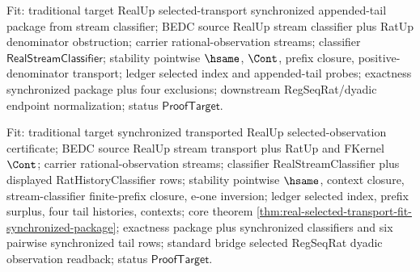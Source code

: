 Fit: traditional target RealUp selected-transport synchronized appended-tail package from stream classifier; BEDC source RealUp stream classifier plus RatUp
denominator obstruction; carrier rational-observation streams; classifier $\mathsf{RealStreamClassifier}$; stability pointwise $\hsame$, $\Cont$, prefix
closure, positive-denominator transport; ledger selected index and appended-tail probes; exactness synchronized package plus four exclusions; downstream
RegSeqRat/dyadic endpoint normalization; status $\mathsf{ProofTarget}$.

Fit: traditional target synchronized transported RealUp selected-observation
certificate; BEDC source RealUp stream transport plus RatUp and FKernel
$\Cont$; carrier rational-observation streams; classifier RealStreamClassifier
plus displayed RatHistoryClassifier rows; stability pointwise $\hsame$, context
closure, stream-classifier finite-prefix closure, e-one inversion; ledger
selected index, prefix surplus, four tail histories, contexts; core theorem
\autoref{thm:real-selected-transport-fit-synchronized-package}; exactness
package plus synchronized classifiers and six pairwise synchronized tail rows;
standard bridge selected RegSeqRat dyadic observation readback; status
$\mathsf{ProofTarget}$.
